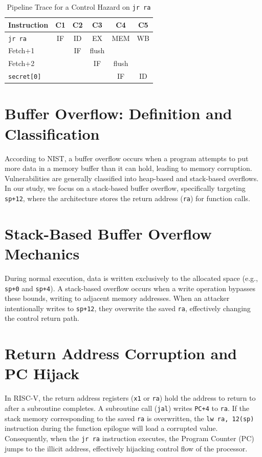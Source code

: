 \begin{table}[h]
\caption{Pipeline Trace for a Control Hazard on \texttt{jr ra}}
\centering
\begin{tabular}{|l|c|c|c|c|c|}
\hline
\textbf{Instruction} & \textbf{C1} & \textbf{C2} & \textbf{C3} & \textbf{C4} & \textbf{C5} \\
\hline
\texttt{jr ra} & IF & ID & EX & MEM & WB \\
Fetch+1 & & IF & flush & & \\
Fetch+2 & & & IF & flush & \\
\texttt{secret[0]} & & & & IF & ID \\
\hline
\end{tabular}
\label{tab:hazard_trace}
\end{table}

\section{Buffer Overflow: Definition and Classification}
According to NIST, a buffer overflow occurs when a program attempts to put more data in a memory buffer than it can hold, leading to memory corruption. Vulnerabilities are generally classified into heap-based and stack-based overflows. In our study, we focus on a stack-based buffer overflow, specifically targeting \texttt{sp+12}, where the architecture stores the return address (\texttt{ra}) for function calls.

\section{Stack-Based Buffer Overflow Mechanics}
During normal execution, data is written exclusively to the allocated space (e.g., \texttt{sp+0} and \texttt{sp+4}). A stack-based overflow occurs when a write operation bypasses these bounds, writing to adjacent memory addresses. When an attacker intentionally writes to \texttt{sp+12}, they overwrite the saved \texttt{ra}, effectively changing the control return path.

\section{Return Address Corruption and PC Hijack}
In RISC-V, the return address registers (\texttt{x1} or \texttt{ra}) hold the address to return to after a subroutine completes. A subroutine call (\texttt{jal}) writes \texttt{PC+4} to \texttt{ra}. If the stack memory corresponding to the saved \texttt{ra} is overwritten, the \texttt{lw ra, 12(sp)} instruction during the function epilogue will load a corrupted value. Consequently, when the \texttt{jr ra} instruction executes, the Program Counter (PC) jumps to the illicit address, effectively hijacking control flow of the processor.
